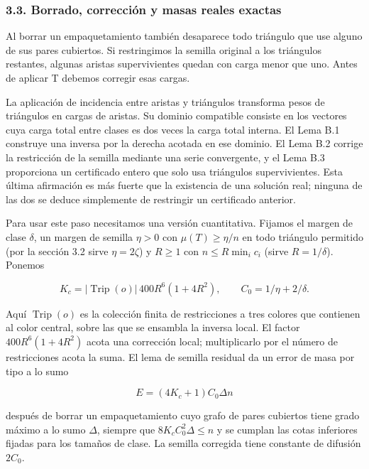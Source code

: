 \documentclass[spanish,11pt,a4paper]{article}
\begin{document}
\subsubsection{3.3. Borrado, corrección y masas reales exactas}\label{borrado-correcciuxf3n-y-masas-reales-exactas}

Al borrar un empaquetamiento también desaparece todo triángulo que use alguno de sus pares cubiertos. Si restringimos la semilla original a los triángulos restantes, algunas aristas supervivientes quedan con carga menor que uno. Antes de aplicar T debemos corregir esas cargas.

La aplicación de incidencia entre aristas y triángulos transforma pesos de triángulos en cargas de aristas. Su dominio compatible consiste en los vectores cuya carga total entre clases es dos veces la carga total interna. El Lema B.1 construye una inversa por la derecha acotada en ese dominio. El Lema B.2 corrige la restricción de la semilla mediante una serie convergente, y el Lema B.3 proporciona un certificado entero que solo usa triángulos supervivientes. Esta última afirmación es más fuerte que la existencia de una solución real; ninguna de las dos se deduce simplemente de restringir un certificado anterior.

Para usar este paso necesitamos una versión cuantitativa. Fijamos el margen de clase \(\delta\), un margen de semilla \(\eta>0\) con \(\mu(T)\ge\eta/n\) en todo triángulo permitido (por la sección 3.2 sirve \(\eta=2\zeta\)) y \(R\ge1\) con \(n\le R\min_ic_i\) (sirve \(R=1/\delta\)). Ponemos

\[K_c=|\operatorname{Trip}(o)|\,400R^6(1+4R^2),\qquad C_0=1/\eta+2/\delta.\]

Aquí \(\operatorname{Trip}(o)\) es la colección finita de restricciones a tres colores que contienen al color central, sobre las que se ensambla la inversa local. El factor \(400R^6(1+4R^2)\) acota una corrección local; multiplicarlo por el número de restricciones acota la suma. El lema de semilla residual da un error de masa por tipo a lo sumo

\[E=(4K_c+1)C_0\Delta n\tag{3.2}\]

después de borrar un empaquetamiento cuyo grafo de pares cubiertos tiene grado máximo a lo sumo \(\Delta\), siempre que \(8K_cC_0^2\Delta\le n\) y se cumplan las cotas inferiores fijadas para los tamaños de clase. La semilla corregida tiene constante de difusión \(2C_0\).
\end{document}
